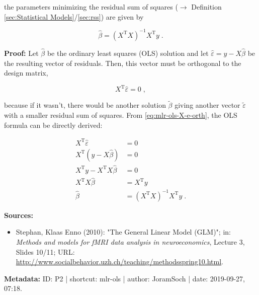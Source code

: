 \documentclass[a4paper,12pt,twoside]{book}
\begin{document}
the parameters minimizing the residual sum of squares ($\rightarrow$ Definition \ref{sec:Statistical Models}/\ref{sec:rss}) are given by

\begin{equation} \label{eq:mlr-ols-OLS}
\hat{\beta} = (X^\mathrm{T} X)^{-1} X^\mathrm{T} y \; .
\end{equation}


\vspace{1em}
\textbf{Proof:} Let $\hat{\beta}$ be the ordinary least squares (OLS) solution and let $\hat{\varepsilon} = y - X\hat{\beta}$ be the resulting vector of residuals. Then, this vector must be orthogonal to the design matrix,

\begin{equation} \label{eq:mlr-ols-X-e-orth}
X^\mathrm{T} \hat{\varepsilon} = 0 \; ,
\end{equation}

because if it wasn't, there would be another solution $\tilde{\beta}$ giving another vector $\tilde{\varepsilon}$ with a smaller residual sum of squares. From \eqref{eq:mlr-ols-X-e-orth}, the OLS formula can be directly derived:

\begin{equation} \label{eq:mlr-ols-OLS-qed}
\begin{split}
X^\mathrm{T} \hat{\varepsilon} &= 0 \\
X^\mathrm{T} \left( y - X\hat{\beta} \right) &= 0 \\
X^\mathrm{T} y - X^\mathrm{T} X\hat{\beta} &= 0 \\
X^\mathrm{T} X\hat{\beta} &= X^\mathrm{T} y \\
\hat{\beta} &= (X^\mathrm{T} X)^{-1} X^\mathrm{T} y \; .
\end{split}
\end{equation}


\vspace{1em}
\textbf{Sources:}
\begin{itemize}
\item Stephan, Klaas Enno (2010): "The General Linear Model (GLM)"; in: \textit{Methods and models for fMRI data analysis in neuroeconomics}, Lecture 3, Slides 10/11; URL: \url{http://www.socialbehavior.uzh.ch/teaching/methodsspring10.html}.
\end{itemize}


\vspace{1em}
\textbf{Metadata:} ID: P2 | shortcut: mlr-ols | author: JoramSoch | date: 2019-09-27, 07:18.
\vspace{1em}
\end{document}
